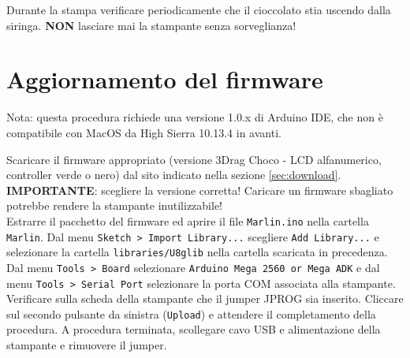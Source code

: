 \documentclass[12pt]{article}
\begin{document}
	Durante la stampa verificare periodicamente che il cioccolato stia uscendo dalla siringa. \textbf{NON} lasciare mai la stampante senza sorveglianza!

\section{Aggiornamento del firmware}

	Nota: questa procedura richiede una versione 1.0.x di Arduino IDE, che non è compatibile con MacOS da High Sierra 10.13.4 in avanti.

	Scaricare il firmware appropriato (versione 3Drag Choco - LCD alfanumerico, controller verde o nero) dal sito indicato nella sezione \ref{sec:download}.\\
	
	\textbf{IMPORTANTE}: scegliere la versione corretta! Caricare un firmware sbagliato potrebbe rendere la stampante inutilizzabile!\\
	
	Estrarre il pacchetto del firmware ed aprire il file \texttt{Marlin.ino} nella cartella \texttt{Marlin}. Dal menu \texttt{Sketch > Import Library...} scegliere \texttt{Add Library...} e selezionare la cartella \texttt{libraries/U8glib} nella cartella scaricata in precedenza.
	Dal menu \texttt{Tools > Board} selezionare \texttt{Arduino Mega 2560 or Mega ADK} e dal menu \texttt{Tools > Serial Port} selezionare la porta COM associata alla stampante. Verificare sulla scheda della stampante che il jumper JPROG sia inserito. Cliccare sul secondo pulsante da sinistra (\texttt{Upload}) e attendere il completamento della procedura. 
	A procedura terminata, scollegare cavo USB e alimentazione della stampante e rimuovere il jumper.
\end{document}
